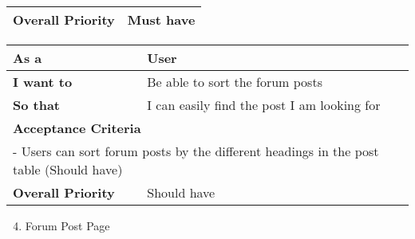 \begin{table}[H]
\begin{tabular}{|ll|}
    \multicolumn{1}{|l|}{\textbf{Overall Priority}}                                                                                                                                                                          & Must have                                                                                                                                                                                                           \\ \hline
    \end{tabular}
\end{table}

\begin{table}[H]
    \begin{tabular}{|ll|}
    \hline
    \multicolumn{1}{|l|}{\textbf{As a}}              & User                                        \\ \hline
    \multicolumn{1}{|l|}{\textbf{I want to}}         & Be able to sort the forum posts             \\ \hline
    \multicolumn{1}{|l|}{\textbf{So that}}           & I can easily find the post I am looking for \\ \hline
    \multicolumn{2}{|l|}{\textbf{Acceptance Criteria}}                                             \\ \hline
    \multicolumn{2}{|l|}{- Users can sort forum posts by the different headings in the post table (Should have)} \\ \hline
    \multicolumn{1}{|l|}{\textbf{Overall Priority}}  & Should have                                 \\ \hline
    \end{tabular}
\end{table}

\begin{enumerate}
    \setcounter{enumi}{3}
    \item Forum Post Page
\end{enumerate}

